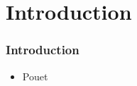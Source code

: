 \section{Introduction}
  \begin{frame}
    \frametitle{Introduction}
    \begin{itemize}
      \item Pouet
    \end{itemize}
  \end{frame}

